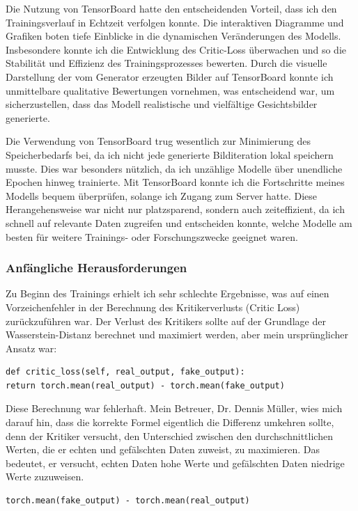 \documentclass[a4paper, 12pt]{article}
\begin{document}
Die Nutzung von TensorBoard hatte den entscheidenden Vorteil, dass ich den Trainingsverlauf in Echtzeit verfolgen konnte. Die interaktiven Diagramme und Grafiken boten tiefe Einblicke in die dynamischen Veränderungen des Modells. Insbesondere konnte ich die Entwicklung des Critic-Loss überwachen und so die Stabilität und Effizienz des Trainingsprozesses bewerten. Durch die visuelle Darstellung der vom Generator erzeugten Bilder auf TensorBoard konnte ich unmittelbare qualitative Bewertungen vornehmen, was entscheidend war, um sicherzustellen, dass das Modell realistische und vielfältige Gesichtsbilder generierte.

Die Verwendung von TensorBoard trug wesentlich zur Minimierung des Speicherbedarfs bei, da ich nicht jede generierte Bilditeration lokal speichern musste. Dies war besonders nützlich, da ich unzählige Modelle über unendliche Epochen hinweg trainierte. Mit TensorBoard konnte ich die Fortschritte meines Modells bequem überprüfen, solange ich Zugang zum Server hatte. Diese Herangehensweise war nicht nur platzsparend, sondern auch zeiteffizient, da ich schnell auf relevante Daten zugreifen und entscheiden konnte, welche Modelle am besten für weitere Trainings- oder Forschungszwecke geeignet waren.

\subsubsection{Anfängliche Herausforderungen}
Zu Beginn des Trainings erhielt ich sehr schlechte Ergebnisse, was auf einen Vorzeichenfehler in der Berechnung des Kritikerverlusts (Critic Loss) zurückzuführen war. Der Verlust des Kritikers sollte auf der Grundlage der Wasserstein-Distanz berechnet und maximiert werden, aber mein ursprünglicher Ansatz war:

\begin{verbatim}
def critic_loss(self, real_output, fake_output):
return torch.mean(real_output) - torch.mean(fake_output)
\end{verbatim}

Diese Berechnung war fehlerhaft. Mein Betreuer, Dr. Dennis Müller, wies mich darauf hin, dass die korrekte Formel eigentlich die Differenz umkehren sollte, denn der Kritiker versucht, den Unterschied zwischen den durchschnittlichen Werten, die er echten und gefälschten Daten zuweist, zu maximieren. Das bedeutet, er versucht, echten Daten hohe Werte und gefälschten Daten niedrige Werte zuzuweisen.

\begin{verbatim}
torch.mean(fake_output) - torch.mean(real_output)
\end{verbatim}
\end{document}
